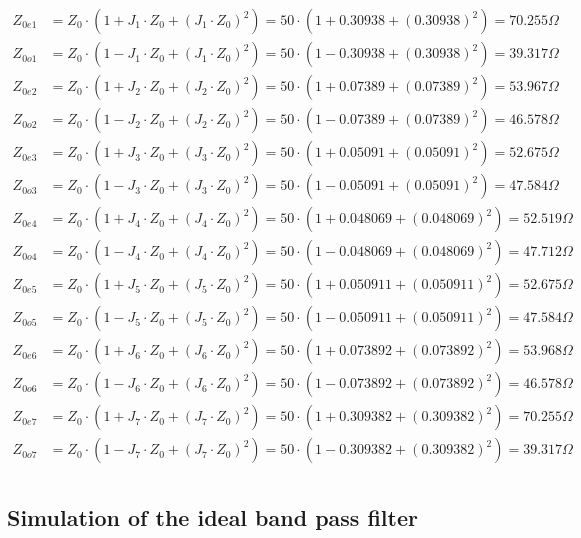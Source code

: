 \documentclass[12pt]{report} %
\begin{document}
\begin{align*}
Z_{0e1} &= Z_0 \cdot (1 + J_1 \cdot Z_0 + (J_1 \cdot Z_0)^2) = 50 \cdot (1 + 0.30938 + (0.30938)^2) = 70.255\Omega \\
Z_{0o1} &= Z_0 \cdot (1 - J_1 \cdot Z_0 + (J_1 \cdot Z_0)^2) = 50 \cdot (1 - 0.30938 + (0.30938)^2) = 39.317\Omega \\
Z_{0e2} &= Z_0 \cdot (1 + J_2 \cdot Z_0 + (J_2 \cdot Z_0)^2) = 50 \cdot (1 + 0.07389 + (0.07389)^2) = 53.967\Omega \\
Z_{0o2} &= Z_0 \cdot (1 - J_2 \cdot Z_0 + (J_2 \cdot Z_0)^2) = 50 \cdot (1 - 0.07389 + (0.07389)^2) = 46.578\Omega \\
Z_{0e3} &= Z_0 \cdot (1 + J_3 \cdot Z_0 + (J_3 \cdot Z_0)^2) = 50 \cdot (1 + 0.05091 + (0.05091)^2) = 52.675\Omega \\
Z_{0o3} &= Z_0 \cdot (1 - J_3 \cdot Z_0 + (J_3 \cdot Z_0)^2) = 50 \cdot (1 - 0.05091 + (0.05091)^2) = 47.584\Omega \\
Z_{0e4} &= Z_0 \cdot (1 + J_4 \cdot Z_0 + (J_4 \cdot Z_0)^2) = 50 \cdot (1 + 0.048069 + (0.048069)^2) = 52.519\Omega \\
Z_{0o4} &= Z_0 \cdot (1 - J_4 \cdot Z_0 + (J_4 \cdot Z_0)^2) = 50 \cdot (1 - 0.048069 + (0.048069)^2) = 47.712\Omega \\
Z_{0e5} &= Z_0 \cdot (1 + J_5 \cdot Z_0 + (J_5 \cdot Z_0)^2) = 50 \cdot (1 +  0.050911 + ( 0.050911)^2) = 52.675\Omega \\
Z_{0o5} &= Z_0 \cdot (1 - J_5 \cdot Z_0 + (J_5 \cdot Z_0)^2) = 50 \cdot (1 -  0.050911 + ( 0.050911)^2) = 47.584\Omega \\
Z_{0e6} &= Z_0 \cdot (1 + J_6 \cdot Z_0 + (J_6 \cdot Z_0)^2) = 50 \cdot (1 + 0.073892 + (0.073892)^2) = 53.968\Omega \\
Z_{0o6} &= Z_0 \cdot (1 - J_6 \cdot Z_0 + (J_6 \cdot Z_0)^2) = 50 \cdot (1 - 0.073892 + (0.073892)^2) = 46.578\Omega \\
Z_{0e7} &= Z_0 \cdot (1 + J_7 \cdot Z_0 + (J_7 \cdot Z_0)^2) = 50 \cdot (1 + 0.309382 + (0.309382)^2) = 70.255\Omega \\
Z_{0o7} &= Z_0 \cdot (1 - J_7 \cdot Z_0 + (J_7 \cdot Z_0)^2) = 50 \cdot (1 - 0.309382 + (0.309382)^2) = 39.317\Omega \\
\end{align*}

\subsection{Simulation of the ideal band pass filter}
\end{document}
